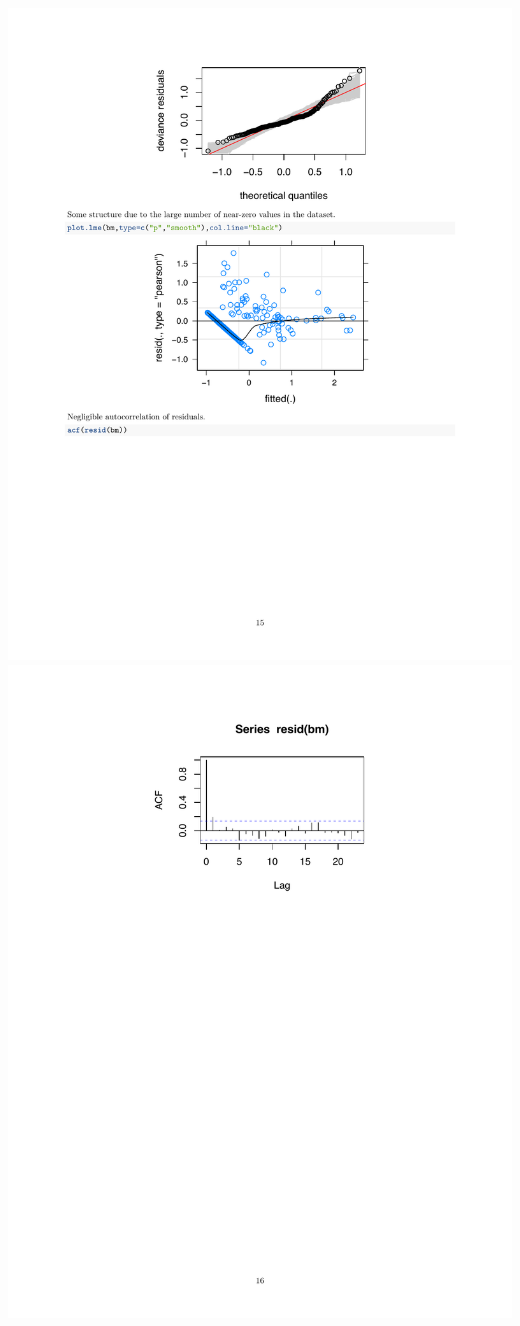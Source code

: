 \documentclass[a4paper, twoside]{templates/ociamthesis}
\begin{document}
\includegraphics[width=1\linewidth]{pdf_chapters/lights/lights_supp_crop_Part49}
\includegraphics[width=1\linewidth]{pdf_chapters/lights/lights_supp_crop_Part50}
\end{document}
